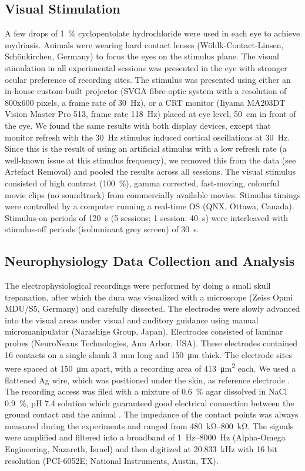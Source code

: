 \subsection{Visual Stimulation}
A few drops of \SI{1}{\percent} cyclopentolate hydrochloride were used in each eye to achieve mydriasis.
Animals were wearing hard contact lenses (W\"ohlk-Contact-Linsen, Sch\"onkirchen, Germany) to focus the eyes on the stimulus plane.
The visual stimulation in all experimental sessions was presented in the eye with stronger ocular preference of recording sites.
The stimulus was presented using either an in-house custom-built projector (SVGA fibre-optic system with a resolution of 800x600 pixels, a frame rate of \SI{30}{Hz}), or a CRT monitor (Iiyama MA203DT Vision Master Pro 513, frame rate \SI{118}{Hz}) placed at eye level, \SI{50}{\centi\metre} in front of the eye.
We found the same results with both display devices, except that monitor refresh with the \SI{30}{Hz} stimulus induced cortical oscillations at \SI{30}{Hz}.
Since this is the result of using an artificial stimulus with a low refresh rate (a well-known issue at this stimulus frequency), we removed this from the data (see Artefact Removal) and pooled the results across all sessions.
The visual stimulus consisted of high contrast (\SI{100}{\percent}), gamma corrected, fast-moving, colourful movie clips (no soundtrack) from commercially available movies.
Stimulus timings were controlled by a computer running a real-time OS (QNX, Ottawa, Canada).
Stimulus-on periods of \SI{120}{\second} (5 sessions; 1 session: \SI{40}{\second}) were interleaved with stimulus-off periods (isoluminant grey screen) of \SI{30}{\second}.


\subsection{Neurophysiology Data Collection and Analysis}
The electrophysiological recordings were performed by doing a small skull trepanation, after which the dura was visualized with a microscope (Zeiss Opmi MDU/S5, Germany) and carefully dissected.
The electrodes were slowly advanced into the visual areas under visual and auditory guidance using manual micromanipulator (Narashige Group, Japan).
Electrodes consisted of laminar probes (NeuroNexus Technologies, Ann Arbor, USA).
These electrodes contained 16 contacts on a single shank \SI{3}{\milli\metre} long and \SI{150}{\micro\metre} thick.
The electrode sites were spaced at \SI{150}{\micro\metre} apart, with a recording area of \SI{413}{\micro\metre^2} each.
We used a flattened \ac{Ag} wire, which was positioned under the skin, as reference electrode \citep{Murayama2010}.
The recording access was filed with a mixture of \SI{0.6}{\percent} agar dissolved in \ac{NaCl} \SI{0.9}{\percent}, pH 7.4 solution which guaranteed good electrical connection between the ground contact and the animal \citep{Oeltermann2007760}.
The impedance of the contact points was always measured during the experiments and ranged from \SIrange{480}{800}{\kilo\ohm}.
The signals were amplified and filtered into a broadband of \SIrange{1}{8000}{Hz} (Alpha-Omega Engineering, Nazareth, Israel) and then digitized at \SI{20.833}{\kilo\Hz} with 16 bit resolution (PCI-6052E; National Instruments, Austin, TX).

